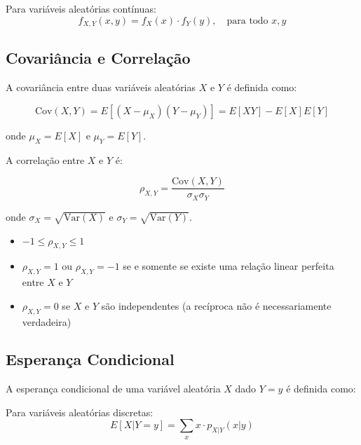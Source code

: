 \documentclass[a4paper,12pt]{article}
\begin{document}
Para variáveis aleatórias contínuas:
\begin{equation}
f_{X,Y}(x,y) = f_X(x) \cdot f_Y(y), \quad \text{para todo } x, y
\end{equation}

\subsection{Covariância e Correlação}

A covariância entre duas variáveis aleatórias $X$ e $Y$ é definida como:

\begin{equation}
\text{Cov}(X,Y) = E[(X - \mu_X)(Y - \mu_Y)] = E[XY] - E[X]E[Y]
\end{equation}

onde $\mu_X = E[X]$ e $\mu_Y = E[Y]$.

A correlação entre $X$ e $Y$ é:

\begin{equation}
\rho_{X,Y} = \frac{\text{Cov}(X,Y)}{\sigma_X \sigma_Y}
\end{equation}

onde $\sigma_X = \sqrt{\text{Var}(X)}$ e $\sigma_Y = \sqrt{\text{Var}(Y)}$.

\begin{tcolorbox}[colback=blue!5, colframe=blue!40, title=\textbf{Propriedades da Correlação}]
\begin{itemize}
    \item $-1 \leq \rho_{X,Y} \leq 1$
    \item $\rho_{X,Y} = 1$ ou $\rho_{X,Y} = -1$ se e somente se existe uma relação linear perfeita entre $X$ e $Y$
    \item $\rho_{X,Y} = 0$ se $X$ e $Y$ são independentes (a recíproca não é necessariamente verdadeira)
\end{itemize}
\end{tcolorbox}

\subsection{Esperança Condicional}

A esperança condicional de uma variável aleatória $X$ dado $Y = y$ é definida como:

Para variáveis aleatórias discretas:
\begin{equation}
E[X|Y=y] = \sum_x x \cdot p_{X|Y}(x|y)
\end{equation}
\end{document}
